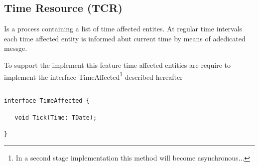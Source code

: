 \subsection{Time Resource (TCR)} 
Is a process containing a list of time affected entites. At regular time intervals each time affected entity is informed abut current time by means of adedicated messge.

To support the implement this feature time affected entities are require to implement the interface TimeAffected\footnote{In a second stage implementation this method will become asynchronous...} described hereafter

\begin{verbatim}

interface TimeAffected {

   void Tick(Time: TDate);

}

\end{verbatim}
